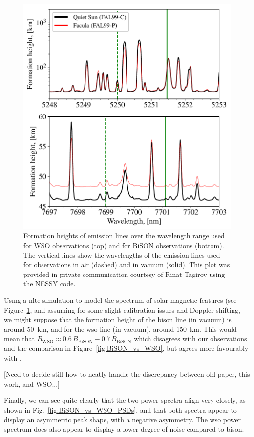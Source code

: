 \begin{figure}[ht!]
	\centering
	\includegraphics[width=0.85\columnwidth]{fheight_high_res.eps}
	\caption{Formation heights of emission lines over the wavelength range used for WSO observations (top) and for BiSON observations (bottom). The vertical lines show the wavelengths of the emission lines used for observations in air (dashed) and in vacuum (solid). This plot was provided in private communication courtesy of Rinat Tagirov using the NESSY code.}
	\label{fig:formation_height}
\end{figure}

Using a \gls{nlte} simulation to model the spectrum of solar magnetic features (see Figure~\ref{fig:formation_height}, and assuming for some slight calibration issues and Doppler shifting, we might suppose that the formation height of the \gls{bison} line (in vacuum) is around 50~km, and for the \gls{wso} line (in vacuum), around 150~km. This would mean that $B_\mathrm{WSO} \approx 0.6\, B_\mathrm{BiSON} - 0.7 \, B_\mathrm{BiSON}$ which disagrees with our observations and the comparison in Figure~\ref{fig:BiSON_vs_WSO}, but agrees more favourably with \citet{chaplin_studies_2003}.

[Need to decide still how to neatly handle the discrepancy between old paper, this work, and WSO...]


Finally, we can see quite clearly that the two power spectra align very closely, as shown in Fig.~\ref{fig:BiSON_vs_WSO_PSDs}, and that both spectra appear to display an asymmetric peak shape, with a negative asymmetry. The \gls{wso} power spectrum does also appear to display a lower degree of noise compared to \gls{bison}.






